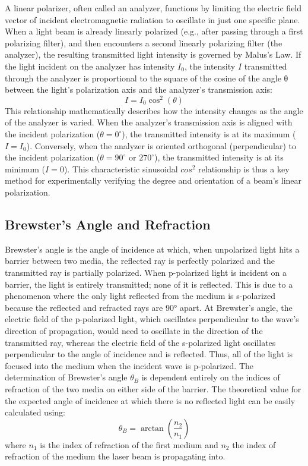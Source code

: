 \documentclass[12pt,a4paper]{article}
\begin{document}
A linear polarizer, often called an analyzer, functions by limiting the electric field vector of incident electromagnetic radiation to oscillate in just one specific plane.
When a light beam is already linearly polarized (e.g., after passing through a first polarizing filter), and then encounters a second linearly polarizing filter (the analyzer), the resulting transmitted light intensity is governed by Malus's Law.
If the light incident on the analyzer has intensity $I_0$, the intensity $I$ transmitted through the analyzer is proportional to the square of the cosine of the angle θ between the light's polarization axis and the analyzer's transmission axis:
\begin{equation}
I = I_0 \cos^2(\theta)
\label{eq:malus}
\end{equation}
This relationship mathematically describes how the intensity changes as the angle of the analyzer is varied.
When the analyzer's transmission axis is aligned with the incident polarization ($\theta = 0^{\circ}$), the transmitted intensity is at its maximum ($I=I_0$).
Conversely, when the analyzer is oriented orthogonal (perpendicular) to the incident polarization ($\theta = 90^{\circ}$ or $270^{\circ}$), the transmitted intensity is at its minimum ($I=0$).
This characteristic sinusoidal $cos^2$ relationship is thus a key method for experimentally verifying the degree and orientation of a beam's linear polarization.

\subsection{Brewster's Angle and Refraction}
Brewster's angle is the angle of incidence at which, when unpolarized light hits a barrier between two media, the reflected ray is perfectly polarized and the transmitted ray is partially polarized. When p-polarized light is incident on a barrier, the light is entirely transmitted; none of it is reflected. This is due to a phenomenon where the only light reflected from the medium is s-polarized because the reflected and refracted rays are 90° apart. At Brewster's angle, the electric field of the p-polarized light, which oscillates perpendicular to the wave's direction of propagation, would need to oscillate in the direction of the transmitted ray, whereas the electric field of the s-polarized light oscillates perpendicular to the angle of incidence and is reflected. Thus, all of the light is focused into the medium when the incident wave is p-polarized. The determination of Brewster's angle $\theta_B$ is dependent entirely on the indices of refraction of the two media on either side of the barrier. The theoretical value for the expected angle of incidence at which there is no reflected light can be easily calculated using:
\begin{equation}
\theta_{B} = \arctan\left(\frac{n_{2}}{n_{1}}\right)
\end{equation}
where $n_1$ is the index of refraction of the first medium and $n_2$ the index of refraction of the medium the laser beam is propagating into.
\end{document}
